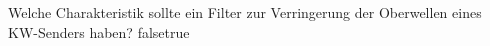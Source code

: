     {Welche Charakteristik sollte ein Filter zur Verringerung der Oberwellen eines KW-Senders haben?}
    {}
    {}
    {}
    {}
    {false}{true}